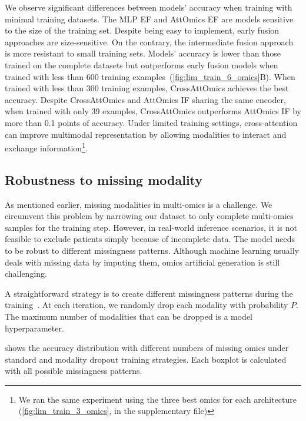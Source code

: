 \documentclass[../main.tex]{subfiles}
\begin{document}
     We observe significant differences between models' accuracy when training with minimal training datasets.
     The MLP EF and AttOmics EF are models sensitive to the size of the training set.
     Despite being easy to implement, early fusion approaches are size-sensitive.
     On the contrary, the intermediate fusion approach is more resistant to small training sets.
     Models' accuracy is lower than those trained on the complete datasets but outperforms early fusion models when trained with less than 600 training examples~(\cref{fig:lim_train_6_omics}B).
     When trained with less than 300 training examples, CrossAttOmics achieves the best accuracy.
     Despite CrossAttOmics and AttOmics IF sharing the same encoder, when trained with only 39 examples, CrossAttOmics outperforms AttOmics IF by more than 0.1 points of accuracy.
     Under limited training settings, cross-attention can improve multimodal representation by allowing modalities to interact and exchange information\footnote{We ran the same experiment using the three best omics for each architecture (\cref{fig:lim_train_3_omics}, in the supplementary file)}.

 \subsection{Robustness to missing modality}
     As mentioned earlier, missing modalities in multi-omics is a challenge.
     We circumvent this problem by narrowing our dataset to only complete multi-omics samples for the training step.
     However, in real-world inference scenarios, it is not feasible to exclude patients simply because of incomplete data.
     The model needs to be robust to different missingness patterns.
     Although machine learning usually deals with missing data by imputing them, omics artificial generation is still challenging.

     A straightforward strategy is to create different missingness patterns during the training~\cite{Cheerla2019}.
     At each iteration, we randomly drop each modality with probability $P$.
     The maximum number of modalities that can be dropped is a model hyperparameter.

      shows the accuracy distribution with different numbers of missing omics under standard and modality dropout training strategies.
     Each boxplot is calculated with all possible missingness patterns.
\end{document}
